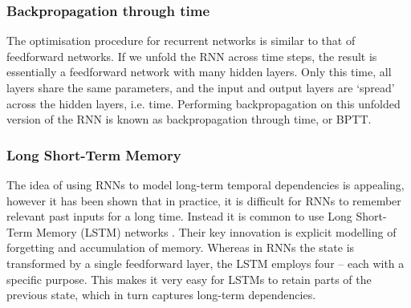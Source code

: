 \documentclass[../../report.tex]{subfiles}
\begin{document}

\subsubsection{Backpropagation through time}
The optimisation procedure for recurrent networks is similar to that of
feedforward networks. If we unfold the RNN across time steps, the result is
essentially a feedforward network with many\footnotemark{} hidden layers. Only
this time, all layers share the same parameters, and the input and output layers
are `spread' across the hidden layers, i.e. time. Performing backpropagation on
this unfolded version of the RNN is known as backpropagation through time, or
BPTT.



\subsubsection{Long Short-Term Memory}
The idea of using RNNs to model long-term temporal dependencies is appealing,
however it has been shown \cite{Bengio1994} that in practice, it is difficult
for RNNs to remember relevant past inputs for a long time. Instead it is common
to use Long Short-Term Memory (LSTM) networks \cite{Hochreiter1997}. Their key
innovation is explicit modelling of forgetting and accumulation of memory.
Whereas in RNNs the state is transformed by a single feedforward layer, the LSTM
employs four -- each with a specific purpose. This makes it very easy for LSTMs
to retain parts of the previous state, which in turn captures long-term
dependencies.

\end{document}
